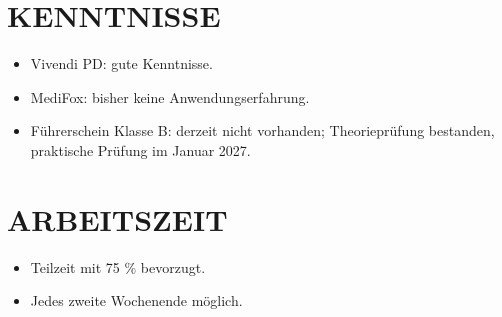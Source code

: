\documentclass[11pt,a4paper]{article}
\begin{document}
\section*{KENNTNISSE}
\begin{itemize}
\item Vivendi PD: gute Kenntnisse.
\item MediFox: bisher keine Anwendungserfahrung.
\item Führerschein Klasse B: derzeit nicht vorhanden; Theorieprüfung bestanden, praktische Prüfung im Januar 2027.
\end{itemize}

\section*{ARBEITSZEIT}
\begin{itemize}
\item Teilzeit mit 75 \% bevorzugt.
\item Jedes zweite Wochenende möglich.
\end{itemize}
\end{document}
